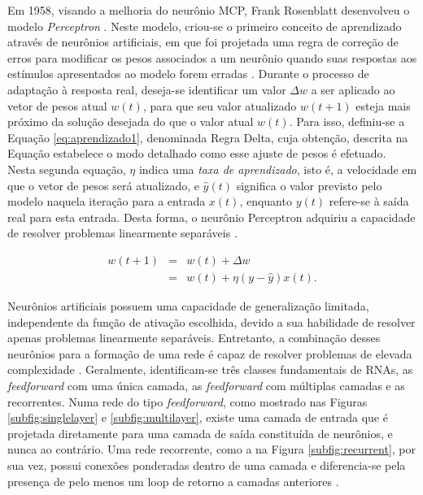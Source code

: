 Em 1958, visando a melhoria do neurônio MCP, Frank Rosenblatt desenvolveu o modelo \emph{Perceptron} \cite{Rosenblatt}. Neste modelo, criou-se o primeiro conceito de aprendizado através de neurônios artificiais, em que foi projetada uma regra de correção de erros para modificar os pesos associados a um neurônio quando suas respostas aos estímulos apresentados ao modelo forem erradas \cite{arbib}. Durante o processo de adaptação à resposta real, deseja-se identificar um valor $\Delta w$ a ser aplicado ao vetor de pesos atual $w(t)$, para que seu valor atualizado $w(t+1)$ esteja mais próximo da solução desejada do que o valor atual $w(t)$. Para isso, definiu-se a Equação \ref{eq:aprendizado1}, denominada Regra Delta, cuja obtenção, descrita na Equação \label{eq:aprendizado2} estabelece o modo detalhado como esse ajuste de pesos é efetuado. Nesta segunda equação, $\eta$ indica uma \emph{taxa de aprendizado}, isto é, a velocidade em que o vetor de pesos será atualizado, e $\hat{y}(t)$ significa o valor previsto pelo modelo naquela iteração para a entrada $x(t)$, enquanto $y(t)$ refere-se à saída real para esta entrada. Desta forma, o neurônio Perceptron adquiriu a capacidade de resolver problemas linearmente separáveis \cite{braga}.

\begin{eqnarray}
  w(t+1) &=& w(t) + \Delta w   \label{eq:aprendizado1}\\
  &=& w(t) + \eta (y - \hat{y}) x(t) \label{eq:aprendizado2}.
\end{eqnarray}

Neurônios artificiais possuem uma capacidade de generalização limitada, independente da função de ativação escolhida, devido a sua habilidade de resolver apenas problemas linearmente separáveis. Entretanto, a combinação desses neurônios para a formação de uma rede é capaz de resolver problemas de elevada complexidade \cite{braga}. Geralmente, identificam-se três classes fundamentais de RNAs, as \emph{feedforward} com uma única camada, as \emph{feedforward} com múltiplas camadas e as recorrentes. Numa rede do tipo \emph{feedforward}, como mostrado nas Figuras \ref{subfig:singlelayer} e \ref{subfig:multilayer}, existe uma camada de entrada que é projetada diretamente para uma camada de saída constituída de neurônios, e nunca ao contrário. Uma rede recorrente, como a na Figura \ref{subfig:recurrent}, por sua vez, possui conexões ponderadas dentro de uma camada e diferencia-se pela presença de pelo menos um loop de retorno a camadas anteriores \cite{haykin}.

